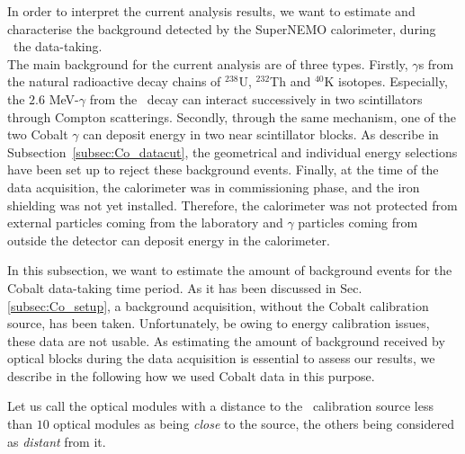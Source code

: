 In order to interpret the current analysis results, we want to estimate and characterise the background detected by the SuperNEMO calorimeter, during \Co\ the data-taking.\\

The main background for the current analysis are of three types.
Firstly, $\gamma$s from the natural radioactive decay chains of $^{238}$U, $^{232}$Th and $^{40}$K isotopes.
Especially, the $2.6$ MeV-$\gamma$ from the \Tl\ decay can interact successively in two scintillators through Compton scatterings.
Secondly, through the same mechanism, one of the two Cobalt $\gamma$ can deposit energy in two near scintillator blocks.
As describe in Subsection~\ref{subsec:Co_datacut}, the geometrical and individual energy selections have been set up to reject these background events.
Finally, at the time of the data acquisition, the calorimeter was in commissioning phase, and the iron shielding was not yet installed.
Therefore, the calorimeter was not protected from external particles coming from the laboratory and $\gamma$ particles coming from outside the detector can deposit energy in the calorimeter.

In this subsection, we want to estimate the amount of background events for the Cobalt data-taking time period.
As it has been discussed in Sec.\ref{subsec:Co_setup}, a background acquisition, without the Cobalt calibration source, has been taken.
Unfortunately, be owing to energy calibration issues, these data are not usable.
As estimating the amount of background received by optical blocks during the data acquisition is essential to assess our results, we describe in the following how we used Cobalt data in this purpose.

Let us call the optical modules with a distance to the \Co\ calibration source less than $10$ optical modules as being \emph{close} to the source, the others being considered as \emph{distant} from it.

